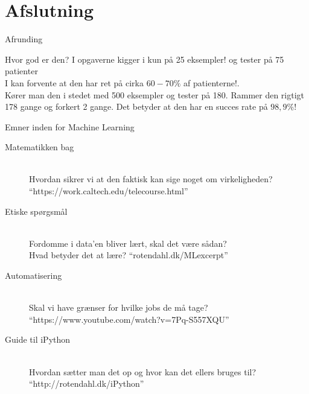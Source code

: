 \documentclass[12pt,t]{beamer}
\begin{document}
    \section{Afslutning}
    \begin{frame}[t]{Afrunding}
    \begin{block}{Hvor god er den?}
        I opgaverne kigger i kun på \alert{25 eksempler!} og tester på 75
        patienter \\
        \pause
        I kan forvente at den har ret på cirka $60-70\%$ af patienterne!.\\
        \pause
        Kører man den i stedet med 500 eksempler og tester på 180. \pause
        Rammer den rigtigt 178 gange og forkert 2 gange. Det betyder at den
        har en succes rate på \alert{$98,9\%$!}
    \end{block}
    \pause
    \end{frame}

    \begin{frame}[t]{Emner inden for Machine Learning}
        \begin{description}
            \item[\alert{Matematikken bag}]~\\
            Hvordan sikrer vi at den faktisk kan sige noget om virkeligheden?
            ``https://work.caltech.edu/telecourse.html''
            \pause
            \item[\alert{Etiske spørgsmål}]~\\
            Fordomme i data'en bliver lært, skal det være sådan? \\
            Hvad betyder det at lære? ``rotendahl.dk/MLexcerpt''
            \pause
            \item[\alert{Automatisering}]~\\
            Skal vi have grænser for hvilke jobs de må tage? \\
            ``https://www.youtube.com/watch?v=7Pq-S557XQU''

            \pause
            \item[\alert{Guide til iPython}]~\\
            Hvordan sætter man det op og hvor kan det ellers bruges til?
            ``http://rotendahl.dk/iPython''
        \end{description}
    \end{frame}
\end{document}
